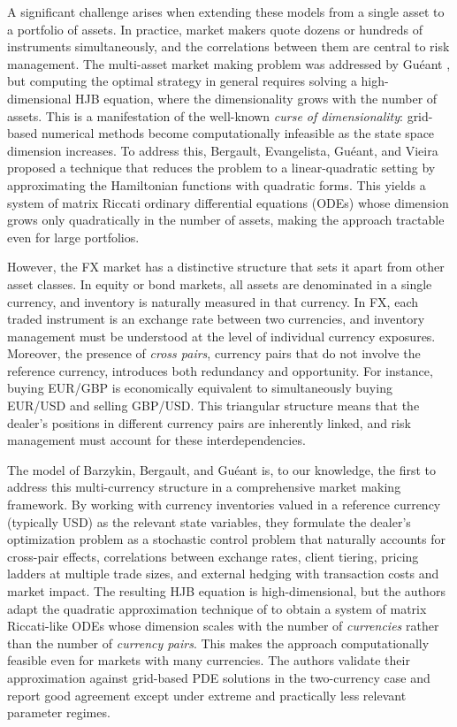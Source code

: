 A significant challenge arises when extending these models from a single asset to a portfolio of assets. In practice, market makers quote dozens or hundreds of instruments simultaneously, and the correlations between them are central to risk management. The multi-asset market making problem was addressed by Gu\'{e}ant \cite{gueant2016, gueant2017}, but computing the optimal strategy in general requires solving a high-dimensional HJB equation, where the dimensionality grows with the number of assets. This is a manifestation of the well-known \emph{curse of dimensionality}: grid-based numerical methods become computationally infeasible as the state space dimension increases. To address this, Bergault, Evangelista, Gu\'{e}ant, and Vieira \cite{bergault2021} proposed a technique that reduces the problem to a
linear-quadratic setting by approximating the Hamiltonian functions with quadratic forms. This yields a system of matrix Riccati ordinary differential equations (ODEs) whose dimension grows only quadratically in the number of assets, making the approach tractable even for large portfolios.

However, the FX market has a distinctive structure that sets it apart from other asset classes. In equity or bond markets, all assets are denominated in a single currency, and inventory is naturally measured in that currency. In FX, each traded instrument is an exchange rate between two currencies, and inventory management must be understood at the level of individual currency exposures. Moreover, the presence of \emph{cross pairs}, currency pairs that do not involve the reference currency, introduces both redundancy and opportunity. For instance, buying EUR/GBP is economically equivalent to simultaneously buying EUR/USD and selling GBP/USD. This triangular structure means that the dealer's positions in different currency pairs are inherently linked, and risk management must account for these interdependencies.

The model of Barzykin, Bergault, and Gu\'{e}ant \cite{barzykin2023} is, to our knowledge, the first to address this multi-currency structure in a comprehensive market making framework. By working with currency inventories valued in a reference currency (typically USD) as the relevant state variables, they formulate the dealer's optimization problem as a stochastic control problem that naturally accounts for cross-pair effects, correlations between exchange rates, client tiering, pricing ladders at multiple trade sizes, and external hedging with transaction costs and market impact. The resulting HJB equation is high-dimensional, but the authors adapt the quadratic approximation technique of \cite{bergault2021} to obtain a system of matrix Riccati-like ODEs whose dimension scales with the number of \emph{currencies} rather than the number of \emph{currency pairs}. This makes the approach computationally feasible even for markets with many currencies. The authors validate their approximation against grid-based PDE solutions in the two-currency case and report good agreement except under extreme and practically less relevant parameter regimes.

